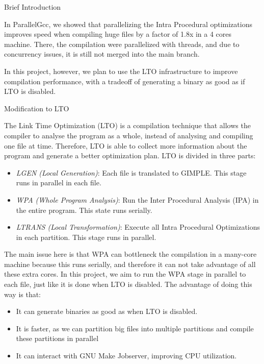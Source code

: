 \documentclass[12pt]{article}
\begin{document}
\begin{section}{Brief Introduction}

In ParallelGcc, we showed that parallelizing the Intra Procedural optimizations
improves speed when compiling huge files by a factor of 1.8x in a 4 cores
machine. There, the compilation were parallelized with threads, and due to
concurrency issues, it is still not merged into the main branch.

In this project, however, we plan to use the LTO infrastructure to improve
compilation performance, with a tradeoff of generating a binary as good as
if LTO is disabled.

\begin{subsection}{Modification to LTO}

The Link Time Optimization (LTO) is a compilation technique that allows the
compiler to analyse the program as a whole, instead of analysing and compiling
one file at time. Therefore, LTO is able to collect more information about
the program and generate a better optimization plan. LTO is divided in three
parts:

\begin{itemize}
    \item \emph{LGEN (Local Generation)}: Each file is translated to GIMPLE. This
        stage runs in parallel in each file.

    \item \emph{WPA (Whole Program Analysis)}: Run the Inter Procedural Analysis (IPA) in the
        entire program. This state runs serially.

    \item \emph{LTRANS (Local Transformation)}: Execute all Intra Procedural Optimizations in
        each partition. This stage runs in parallel.
\end{itemize}

The main issue here is that WPA can bottleneck the compilation in a many-core
machine because this runs serially, and therefore it can not take advantage of
all these extra cores. In this project, we aim to run the WPA stage in parallel
to each file, just like it is done when LTO is disabled. The advantage of doing
this way is that:

\begin{itemize}

    \item It can generate binaries as good as when LTO is disabled.
    \item It is faster, as we can partition big files into multiple partitions
    and compile these partitions in parallel
    \item It can interact with GNU Make Jobserver, improving CPU utilization.


\end{itemize}
\end{subsection}
\end{section}
\end{document}

